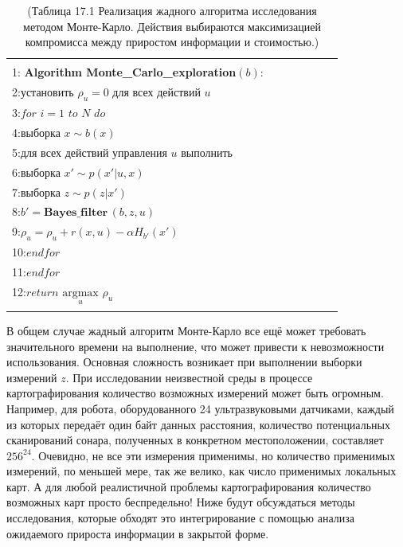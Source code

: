 \documentclass[10pt,a4paper]{article}
\begin{document}
\begin{table}[H]
\begin{center}
\begin{tabular}{|l|}
\hline
{}\\
1:\textbf{ Algorithm Monte\_Carlo\_exploration}$(b):\qquad\qquad\qquad$\\
2:\hspace{5mm}$\textit{установить}\,\,\rho_u=0\,\,\textit{для всех действий u}$\\
3:\hspace{5mm}$\textit{for}\,\,i=1\,\,\textit{to}\,\,N\,\,\textit{do}$\\
4:\hspace{10mm}$\textit{выборка}\,\,x\sim b(x)$\\
5:\hspace{10mm}$\textit{для всех действий управления u выполнить}$\\
6:\hspace{15mm}$\textit{выборка}\,\,x'\sim p(x'|u,x)$\\
7:\hspace{15mm}$\textit{выборка}\,\,z\sim p(z|x')$\\
8:\hspace{15mm}$b'=\textbf{Bayes\_filter}\,(b,z,u)$\\
9:\hspace{15mm}$\rho_u=\rho_u+r(x,u)-\alpha H_{b'}(x')$\\
10:\hspace{9mm}$\textit{endfor}$\\
11:\hspace{4mm}$\textit{endfor}$\\
12:\hspace{5mm}$\textit{return}\,\,\underset{u}{\text{argmax}}\,\,\rho_u$\\
{}\\
\hline
\end{tabular}
\caption{(Таблица 17.1 Реализация жадного алгоритма исследования методом Монте-Карло. Действия выбираются максимизацией компромисса между приростом информации и стоимостью.)}
\end{center}
\end{table}

В общем случае жадный алгоритм Монте-Карло все ещё может требовать значительного времени на выполнение, что может привести к невозможности использования. Основная сложность возникает при выполнении выборки измерений $z$. При исследовании неизвестной среды в процессе картографирования количество возможных измерений может быть огромным. Например, для робота, оборудованного 24 ультразвуковыми датчиками, каждый из которых передаёт один байт данных расстояния, количество потенциальных сканирований сонара, полученных в конкретном местоположении, составляет $256^{24}$. Очевидно, не все эти измерения применимы, но количество применимых измерений, по меньшей мере, так же велико, как число применимых локальных карт. А для любой реалистичной проблемы картографирования количество возможных карт просто беспредельно! Ниже будут обсуждаться методы исследования, которые обходят это интегрирование с помощью анализа ожидаемого прироста информации в закрытой форме.\\
\end{document}
